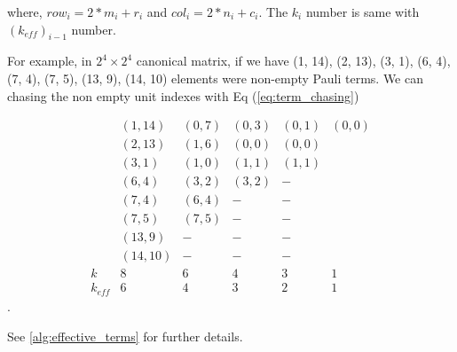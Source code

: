\documentclass[twocolumn]{article}
\begin{document}
where, $row_i = 2*m_i + r_i$ and $col_i = 2*n_i + c_i$.
The $k_i$ number is same with $(k_{eff})_{i-1}$ number. 

For example, in $2^4 \times 2^4$ canonical matrix, 
if we have 
(1, 14), 
(2, 13), 
(3, 1), 
(6, 4),
(7, 4),
(7, 5),
(13, 9),
(14, 10) elements 
were non-empty Pauli terms. 
We can chasing the non empty unit indexes with Eq (\ref{eq:term_chasing})

\begin{equation}
    \begin{array}{lccccc}
                & (1, 14)     & (0, 7)   &  (0, 3)& (0,1)&(0,0)\\
                & (2, 13)     & (1, 6)   &  (0, 0)& (0,0)&\\
                & (3, 1)      & (1, 0)   &  (1, 1)& (1,1)&\\
                & (6, 4)      & (3, 2)   &  (3, 2)& -    &\\
                & (7, 4)      & (6, 4)   &  -     & -    &\\
                & (7, 5)      & (7, 5)   &  -     & -    &\\
                & (13, 9)     & -        &  -     & -    &\\
                & (14, 10)    & -        &  -     & -    &\\
       k        & 8           & 6        &  4     & 3    & 1\\
       k_{eff}  & 6           & 4        &  3     & 2    & 1
    \end{array}
\end{equation}.

See \ref{alg:effective_terms} for further details.

\end{document}
